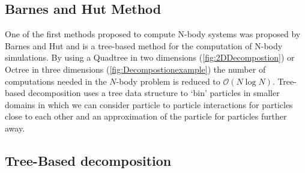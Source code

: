 \subsection{Barnes and Hut Method} \label{subsec:BarnesHut}
One of the first methods proposed to compute N-body systems was proposed by Barnes and Hut \cite{Barnes1986} and is a tree-based method for the computation of N-body simulations. By using a Quadtree in two dimensions (\cref{fig:2DDecompostion}) or Octree in three dimensions (\cref{fig:Decompostionexample}) the number of computations needed in the $N$-body problem is reduced to $\mathcal{O}(N\log N)$. Tree-based decomposition uses a tree data structure to `bin' particles in smaller domains in which we can consider particle to particle interactions for particles close to each other and an approximation of the particle for particles further away. 


\subsection{Tree-Based decomposition} \label{sec:TreeDecomp}

